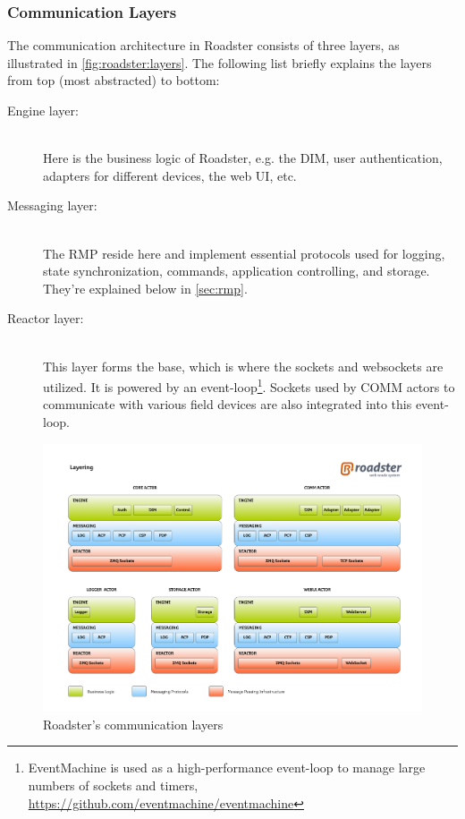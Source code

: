 \subsubsection{Communication Layers}
The communication architecture in Roadster consists of three layers, as
illustrated in \autoref{fig:roadster:layers}. The following list briefly
explains the layers from top (most abstracted) to bottom:

\begin{description}
	\item [Engine layer:]\hfill\\
		Here is the business logic of Roadster, e.g. the \gls{DIM},
		user authentication, adapters for different devices, the web
		\gls{UI}, etc.

	\item [Messaging layer:]\hfill\\
		The \gls{RMP} reside here and implement essential protocols used
		for logging, state synchronization, commands, application controlling,
		and storage. They're explained below in \autoref{sec:rmp}.

	\item [Reactor layer:]\hfill\\
		This layer forms the base, which is where the \zmq sockets and
		\glspl{websocket} are utilized. It is powered by an
		event-loop\footnote{EventMachine is used as a high-performance event-loop to
		manage large numbers of sockets and timers,
		\url{https://github.com/eventmachine/eventmachine}}. Sockets used by COMM actors
		to communicate with various field devices are also integrated into this
		event-loop.
\end{description}

\begin{figure}[]
	\includegraphics[trim=1.95cm 2.5cm 1.65cm 2.8cm, clip=true, width=\textwidth]{img/roadster_layering.pdf}
	\caption{Roadster's communication layers}
	\label{fig:roadster:layers}
\end{figure}

